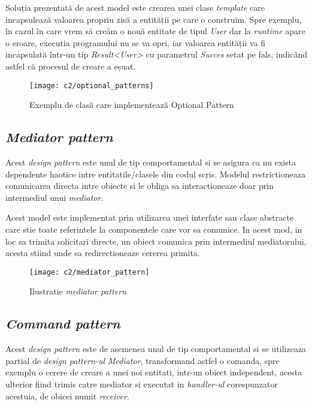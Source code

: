 Soluția prezentată de acest model este crearea unei clase \textit{template} care incapsulează valoarea propriu zisă a entității pe care o construim. Spre exemplu, în cazul în care vrem să creăm o nouă entitate de tipul \textit{User} dar la \textit{runtime} apare o eroare, executia programului nu se va opri, iar valoarea entității va fi incapsulată într-un tip   \textit{Result\textless User\textgreater} cu parametrul \textit{Succes} setat pe fals, indicând astfel că procesul de creare a eșuat.\\

\begin{figure}[h]
	\centering
	
	\texttt{[image: c2/optional\_patterns]}
	\caption{Exemplu de clasă care implementează Optional Pattern}
\end{figure}

\subsection*{\textit{Mediator pattern}}
Acest \textit{design pattern} este unul de tip comportamental si se asigura ca nu exista dependente haotice intre entitatile/clasele din codul scris. Modelul restrictioneaza comunicarea directa intre obiecte si le obliga sa interactioneaze doar prin intermediul unui \textit{mediator}.

Acest model este implementat prin utilizarea unei interfate sau clase abstracte care stie toate referintele la componentele care vor sa comunice. In acest mod, in loc sa trimita solicitari directe, un obiect comunica prin intermediul mediatorului, acesta stiind unde sa redirectioneaze cererea primita.


\begin{figure}[h]
	\centering
	
	\texttt{[image: c2/mediator\_pattern]}
	\caption{Ilustratie \textit{mediator pattern}}
\end{figure}

	\newpage
\subsection*{\textit{Command pattern}}	

Acest \textit{design pattern} este de asemenea unul de tip comportamental si se utilizeaza partial de \textit{design pattern-ul Mediator}, transformand astfel o comanda, spre exemplu o cerere de creare a unei noi entitati, intr-un obiect independent, acesta ulterior fiind trimis catre mediator si executat in \textit{handler-ul} corespunzator acestuia, de obicei numit \textit{receiver}.


